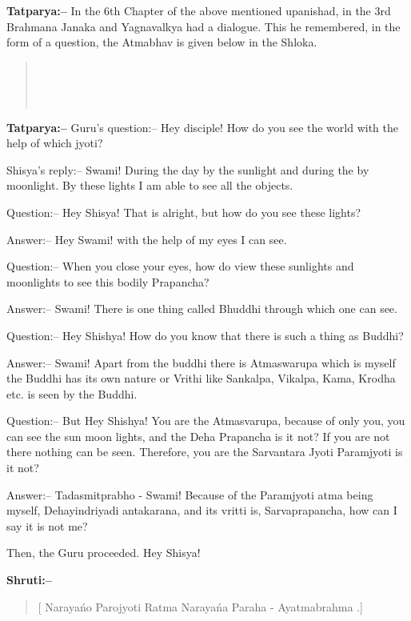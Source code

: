 \textbf{Tatparya:–} In the 6th Chapter of the above mentioned upanishad, in the 3rd Brahmana Janaka and Yagnavalkya had a dialogue. This he remembered, in the form of a question, the Atmabhav is given below in the Shloka.

\begin{verse}
 \\\\\\ 
\end{verse}

\textbf{Tatparya:–} Guru's question:– Hey disciple! How do you see the world with the help of which jyoti?

Shisya's reply:– Swami! During the day by the sunlight and during the by moonlight. By these lights I am able to see all the objects.

Question:– Hey Shisya! That is alright, but how do you see these lights?

Answer:– Hey Swami! with the help of my eyes I can see.

Question:– When you close your eyes, how do view these sunlights and moonlights to see this bodily Prapancha?

Answer:– Swami! There is one thing called Bhuddhi through which one can see.

Question:– Hey Shishya! How do you know that there is such a thing as Buddhi?

Answer:– Swami! Apart from the buddhi there is Atmaswarupa which is myself the Buddhi has its own nature or Vrithi like Sankalpa, Vikalpa, Kama, Krodha etc. is seen by the Buddhi.

Question:– But Hey Shishya! You are the Atmasvarupa, because of only you, you can see the sun moon lights, and the Deha Prapancha is it not? If you are not there nothing can be seen. Therefore, you are the Sarvantara Jyoti Paramjyoti is it not?

Answer:– Tadasmitprabho - Swami! Because of the Paramjyoti atma being myself, Dehayindriyadi antakarana, and its vritti is, Sarvaprapancha, how can I say it is not me?

Then, the Guru proceeded. Hey Shisya!

\textbf{Shruti:–}

\begin{verse}
[ Narayańo Parojyoti Ratma Narayańa Paraha  -  Ayatmabrahma .]
\end{verse}

